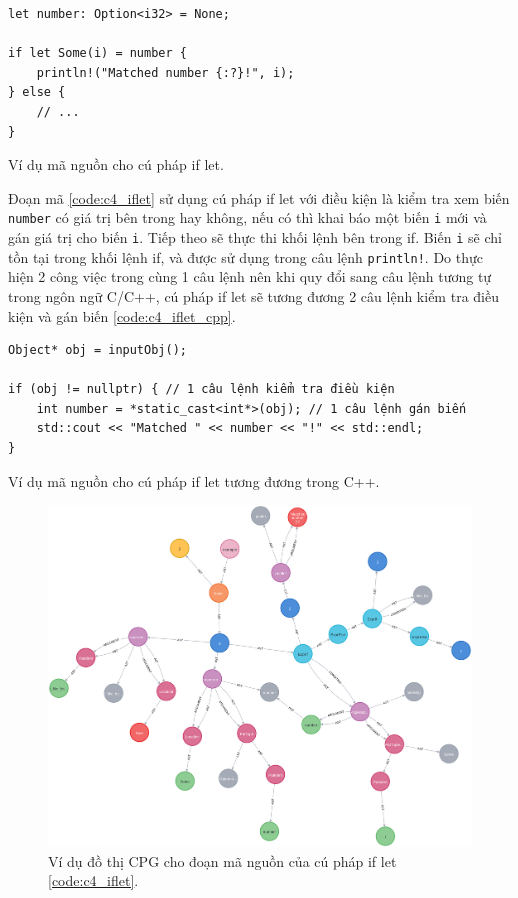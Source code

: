 \begin{listing}[H]
\begin{verbatim}
let number: Option<i32> = None;

if let Some(i) = number {
    println!("Matched number {:?}!", i);
} else {
    // ...
}
\end{verbatim}
\caption{Ví dụ mã nguồn cho cú pháp if let.}
\label{code:c4_iflet}
\end{listing}

Đoạn mã \ref{code:c4_iflet} sử dụng cú pháp if let với điều kiện là kiểm tra xem biến \texttt{number} có giá trị bên trong hay không, nếu có thì khai báo một biến \texttt{i} mới và gán giá trị cho biến \texttt{i}.
Tiếp theo sẽ thực thi khối lệnh bên trong if.
Biến \texttt{i} sẽ chỉ tồn tại trong khối lệnh if, và được sử dụng trong câu lệnh \texttt{println!}.
Do thực hiện 2 công việc trong cùng 1 câu lệnh nên khi quy đổi sang câu lệnh tương tự trong ngôn ngữ C/C++, cú pháp if let sẽ tương đương 2 câu lệnh kiểm tra điều kiện và gán biến \ref{code:c4_iflet_cpp}.

\begin{listing}[H]
\begin{verbatim}
Object* obj = inputObj();

if (obj != nullptr) { // 1 câu lệnh kiểm tra điều kiện
    int number = *static_cast<int*>(obj); // 1 câu lệnh gán biến
    std::cout << "Matched " << number << "!" << std::endl;
}
\end{verbatim}
\caption{Ví dụ mã nguồn cho cú pháp if let tương đương trong C++.}
\label{code:c4_iflet_cpp}
\end{listing}

\begin{figure}[H]
\includegraphics[width=1\columnwidth]{figures/c4/c4_iflet.png}
\centering
\caption{Ví dụ đồ thị CPG cho đoạn mã nguồn của cú pháp if let \ref{code:c4_iflet}.}
\label{img:c4_cpg_iflet}
\end{figure}

